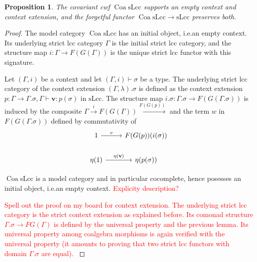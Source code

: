 \documentclass{article}
\newcommand{\todo}[1]{\textcolor{red}{#1}}
\newtheorem{proposition}{Proposition}
\begin{document}
\begin{proposition}
  The covariant cwf $\operatorname{Coa} \mathrm{sLcc}$ supports an empty context and context extension, and the forgetful functor $\operatorname{Coa} \mathrm{sLcc} \rightarrow \mathrm{sLcc}$ preserves both.
\end{proposition}
\begin{proof}
  The model category $\operatorname{Coa} \mathrm{sLcc}$ has an initial object, i.e.\@ an empty context.
  Its underlying strict lcc category $\Gamma$ is the initial strict lcc category, and the structure map $i : \Gamma \rightarrow F(G(\Gamma))$ is the unique strict lcc functor with this signature.

  Let $(\Gamma, i)$ be a context and let $(\Gamma, i) \vdash \sigma$ be a type.
  The underlying strict lcc category of the context extension $(\Gamma,\lambda).\sigma$ is defined as the context extension $p : \Gamma \rightarrow \Gamma.\sigma, \Gamma \vdash \mathbf{v} : p(\sigma)$ in $\mathrm{sLcc}$.
  The structure map $i.\sigma : \Gamma.\sigma \rightarrow F(G(\Gamma.\sigma))$ is induced by the composite $\Gamma \xrightarrow{i} F(G(\Gamma)) \xrightarrow{F(G(p))}$ and the term $w$ in $F(G(\Gamma.\sigma))$ defined by commutativity of
  \begin{equation}
    \begin{tikzcd}
      1 \arrow[r, "v"] & F(G(p))(i(\sigma)) \\
      \eta(1) \arrow[r, "\eta(\mathbf{v})"] & \eta(p(\sigma))
    \end{tikzcd}
  \end{equation}

  $\operatorname{Coa} \mathrm{sLcc}$ is a model category and in particular cocomplete, hence posesses an initial object, i.e.\@ an empty context.
  \todo{Explicity description?}

  \todo{
    Spell out the proof on my board for context extension.
    The underlying strict lcc category is the strict context extension as explained before.
    Its comonad structure $\Gamma.\sigma \rightarrow FG(\Gamma)$ is defined by the universal property and the previous lemma.
    Its universal property among coalgebra morphisms is again verified with the universal property (it amounts to proving that two strict lcc functors with domain $\Gamma.\sigma$ are equal).
  }
\end{proof}
\end{document}
